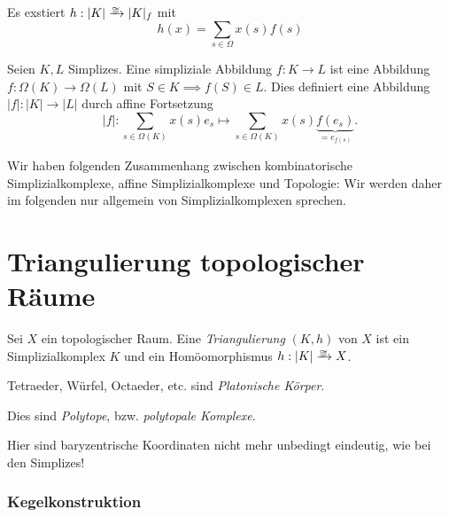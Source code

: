 \begin{nt}
	Es exstiert $h: |K| \homto |K|_f$ mit
	\[
		h(x) = \sum_{s\in \Omega} x(s) f(s)
	\]
\end{nt}

\begin{df}
	Seien $K, L$ Simplizes.
	Eine simpliziale Abbildung $f: K \to L$ ist eine Abbildung $f: \Omega(K) \to \Omega(L)$ mit $S \in K \implies f(S) \in L$.
	Dies definiert eine Abbildung $|f|: |K| \to |L|$ durch affine Fortsetzung
	\[
		|f|:
		\sum_{s \in \Omega(K)} x(s) e_s
		\mapsto
		\sum_{s \in \Omega(K)} x(s) \underbrace{f(e_s)}_{= e_{f(s)}}.
	\]
\end{df}

\begin{nt}
	Wir haben folgenden Zusammenhang zwischen kombinatorische Simplizialkomplexe, affine Simplizialkomplexe und Topologie:
	Wir werden daher im folgenden nur allgemein von Simplizialkomplexen sprechen.
\end{nt}


\section{Triangulierung topologischer Räume}


\begin{df}
	Sei $X$ ein topologischer Raum.
	Eine \emph{Triangulierung} $(K, h)$ von $X$ ist ein Simplizialkomplex $K$ und ein Homöomorphismus $h: |K| \homto X$.
\end{df}


\begin{ex}

	Tetraeder, Würfel, Octaeder, etc. sind \emph{Platonische Körper}.

	Dies sind \emph{Polytope}, bzw. \emph{polytopale Komplexe}.

	Hier sind baryzentrische Koordinaten nicht mehr unbedingt eindeutig, wie bei den Simplizes!
\end{ex}

\subsubsection{Kegelkonstruktion}

